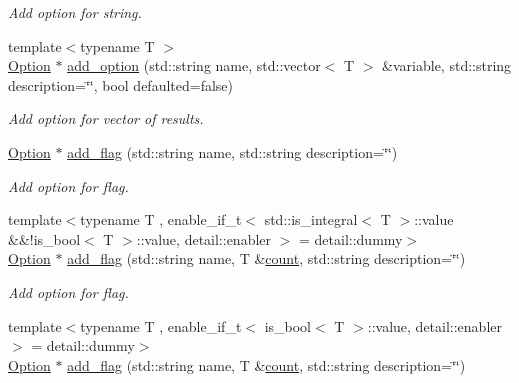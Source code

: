 \begin{DoxyCompactItemize}
\begin{DoxyCompactList}\small\item\em Add option for string. \end{DoxyCompactList}\item 
{\footnotesize template$<$typename T $>$ }\\\hyperlink{class_c_l_i_1_1_option}{Option} $\ast$ \hyperlink{class_c_l_i_1_1_app_a0c65e4b0ad917b965e39d2e8f590bb53}{add\+\_\+option} (std\+::string name, std\+::vector$<$ T $>$ \&variable, std\+::string description=\char`\"{}\char`\"{}, bool defaulted=false)
\begin{DoxyCompactList}\small\item\em Add option for vector of results. \end{DoxyCompactList}\item 
\mbox{\label{class_c_l_i_1_1_app_a58e4d1ac98afdb75a0a689adcb6b173f}} 
\hyperlink{class_c_l_i_1_1_option}{Option} $\ast$ \hyperlink{class_c_l_i_1_1_app_a58e4d1ac98afdb75a0a689adcb6b173f}{add\+\_\+flag} (std\+::string name, std\+::string description=\char`\"{}\char`\"{})
\begin{DoxyCompactList}\small\item\em Add option for flag. \end{DoxyCompactList}\item 
{\footnotesize template$<$typename T , enable\+\_\+if\+\_\+t$<$ std\+::is\+\_\+integral$<$ T $>$\+::value \&\&!is\+\_\+bool$<$ T $>$\+::value, detail\+::enabler $>$  = detail\+::dummy$>$ }\\\hyperlink{class_c_l_i_1_1_option}{Option} $\ast$ \hyperlink{class_c_l_i_1_1_app_ad3608e288902be51227ce8549bac6743}{add\+\_\+flag} (std\+::string name, T \&\hyperlink{class_c_l_i_1_1_app_aeba4b7ab5774f6208ede2e1d56df9b43}{count}, std\+::string description=\char`\"{}\char`\"{})
\begin{DoxyCompactList}\small\item\em Add option for flag. \end{DoxyCompactList}\item 
{\footnotesize template$<$typename T , enable\+\_\+if\+\_\+t$<$ is\+\_\+bool$<$ T $>$\+::value, detail\+::enabler $>$  = detail\+::dummy$>$ }\\\hyperlink{class_c_l_i_1_1_option}{Option} $\ast$ \hyperlink{class_c_l_i_1_1_app_ad3608e288902be51227ce8549bac6743}{add\+\_\+flag} (std\+::string name, T \&\hyperlink{class_c_l_i_1_1_app_aeba4b7ab5774f6208ede2e1d56df9b43}{count}, std\+::string description=\char`\"{}\char`\"{})

\end{DoxyCompactItemize}
